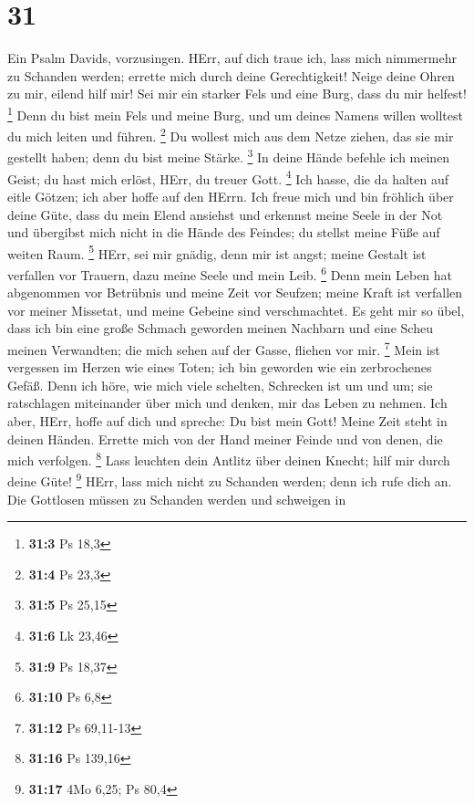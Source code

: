 \hypertarget{section-15}{%
\section{31}\label{section-15}}

 Ein Psalm Davids, vorzusingen.  HErr, auf dich
traue ich, lass mich nimmermehr zu Schanden werden; errette mich durch
deine Gerechtigkeit!  Neige deine Ohren zu mir, eilend hilf
mir! Sei mir ein starker Fels und eine Burg, dass du mir helfest!
\footnote{\textbf{31:3} Ps 18,3}  Denn du bist mein Fels und
meine Burg, und um deines Namens willen wolltest du mich leiten und
führen. \footnote{\textbf{31:4} Ps 23,3}  Du wollest mich
aus dem Netze ziehen, das sie mir gestellt haben; denn du bist meine
Stärke. \footnote{\textbf{31:5} Ps 25,15}  In deine Hände
befehle ich meinen Geist; du hast mich erlöst, HErr, du treuer Gott.
\footnote{\textbf{31:6} Lk 23,46}  Ich hasse, die da halten
auf eitle Götzen; ich aber hoffe auf den HErrn.  Ich freue
mich und bin fröhlich über deine Güte, dass du mein Elend ansiehst und
erkennst meine Seele in der Not  und übergibst mich nicht in
die Hände des Feindes; du stellst meine Füße auf weiten Raum.
\footnote{\textbf{31:9} Ps 18,37}  HErr, sei mir gnädig,
denn mir ist angst; meine Gestalt ist verfallen vor Trauern, dazu meine
Seele und mein Leib. \footnote{\textbf{31:10} Ps 6,8}  Denn
mein Leben hat abgenommen vor Betrübnis und meine Zeit vor Seufzen;
meine Kraft ist verfallen vor meiner Missetat, und meine Gebeine sind
verschmachtet.  Es geht mir so übel, dass ich bin eine
große Schmach geworden meinen Nachbarn und eine Scheu meinen Verwandten;
die mich sehen auf der Gasse, fliehen vor mir. \footnote{\textbf{31:12}
  Ps 69,11-13}  Mein ist vergessen im Herzen wie eines
Toten; ich bin geworden wie ein zerbrochenes Gefäß.  Denn
ich höre, wie mich viele schelten, Schrecken ist um und um; sie
ratschlagen miteinander über mich und denken, mir das Leben zu nehmen.
 Ich aber, HErr, hoffe auf dich und spreche: Du bist mein
Gott!  Meine Zeit steht in deinen Händen. Errette mich von
der Hand meiner Feinde und von denen, die mich verfolgen. \footnote{\textbf{31:16}
  Ps 139,16}  Lass leuchten dein Antlitz über deinen
Knecht; hilf mir durch deine Güte! \footnote{\textbf{31:17} 4Mo 6,25; Ps
  80,4}  HErr, lass mich nicht zu Schanden werden; denn ich
rufe dich an. Die Gottlosen müssen zu Schanden werden und schweigen in
